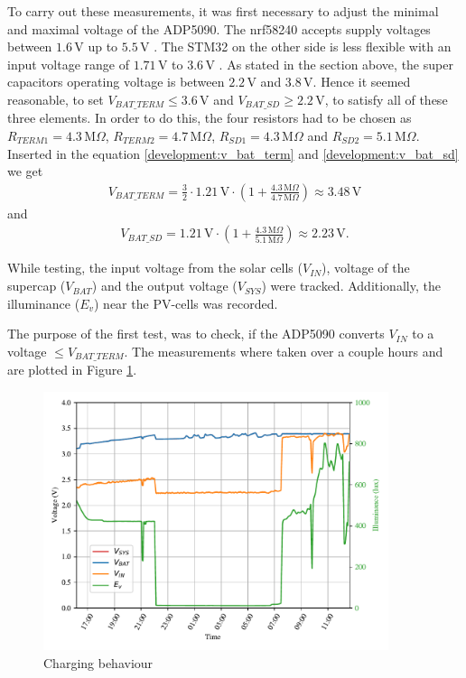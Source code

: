 To carry out these measurements, it was first necessary to adjust the minimal and maximal voltage of the ADP5090.
The nrf58240 accepts supply voltages between $1.6\,\text{V}$ up to $5.5\,\text{V}$ \cite{nrf}.
The STM32 on the other side is less flexible with an input voltage range of $1.71\,\text{V}$ to $3.6\,\text{V}$ \cite{stm32}.
As stated in the section above, the super capacitors operating voltage is between $2.2\,\text{V}$ and $3.8\,\text{V}$.
Hence it seemed reasonable, to set $V_{BAT\_TERM} \le 3.6\,\text{V}$ and $V_{BAT\_SD} \ge 2.2\,\text{V}$, to satisfy all of these three elements.
In order to do this, the four resistors had to be chosen as $R_{TERM1} = 4.3\,\text{M}\Omega$, $R_{TERM2} = 4.7\,\text{M}\Omega$, $R_{SD1} = 4.3\,\text{M}\Omega$ and $R_{SD2} = 5.1\,\text{M}\Omega$.
Inserted in the equation \eqref{development:v_bat_term} and \eqref{development:v_bat_sd} we get
\begin{align*}
	V_{BAT\_TERM}= \frac{3}{2}\cdot 1.21\,\text{V}\cdot \left(1 + \frac{4.3\,\text{M}\Omega}{4.7 \,\text{M}\Omega} \right) \approx 3.48\,\text{V} 
\end{align*}
and
\begin{align*}
	V_{BAT\_SD} = 1.21\,\text{V}\cdot \left(1 + \frac{4.3\,\text{M}\Omega}{5.1\,\text{M}\Omega} \right) \approx 2.23\,\text{V}. 
\end{align*}

While testing, the input voltage from the solar cells ($V_{IN}$), voltage of the supercap ($V_{BAT}$) and the output voltage ($V_{SYS}$) were tracked. Additionally, the illuminance ($E_v$) near the PV-cells  was recorded.

The purpose of the first test, was to check, if the ADP5090 converts $V_{IN}$ to a voltage $\le V_{BAT\_TERM}$.
The measurements where taken over a couple hours and are plotted in Figure \ref{development:charge}.

\begin{figure}[ht]
	\centering
	\includegraphics[width=0.9\textwidth]{4-development/hardware/graphics/laden.pdf}
	\caption{Charging behaviour\label{development:charge}}
\end{figure}

